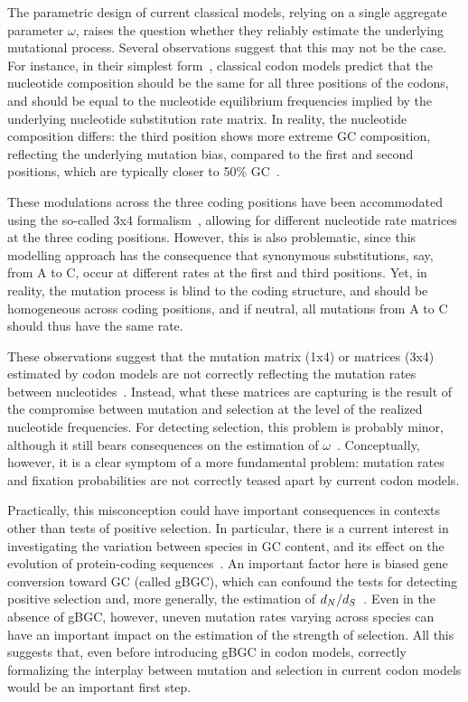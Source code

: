 The parametric design of current classical models, relying on a single aggregate parameter $\omega$, raises the question whether they reliably estimate the underlying mutational process.
Several observations suggest that this may not be the case.
For instance, in their simplest form~\citep{Muse1994, Goldman1994}, classical \gls{codon} models predict that the nucleotide composition should be the same for all three positions of the \glspl{codon}, and should be equal to the nucleotide equilibrium frequencies implied by the underlying nucleotide \gls{substitution} rate matrix.
In reality, the nucleotide composition differs: the third position shows more extreme GC composition, reflecting the underlying mutation bias, compared to the first and second positions, which are typically closer to 50\% GC~\citep{Singer2000}.

These modulations across the three coding positions have been accommodated using the so-called 3x4 formalism~\citep{Goldman1994, Pond2005a}, allowing for different nucleotide rate matrices at the three coding positions.
However, this is also problematic, since this modelling approach has the consequence that \gls{synonymous} \glspl{substitution}, say, from A to C, occur at different rates at the first and third positions.
Yet, in reality, the mutation process is blind to the coding structure, and should be homogeneous across coding positions, and if \gls{neutral}, all mutations from A to C should thus have the same rate.

These observations suggest that the mutation matrix (1x4) or matrices (3x4) estimated by \gls{codon} models are not correctly reflecting the mutation rates between nucleotides~\citep{Rodrigue2008a}.
Instead, what these matrices are capturing is the result of the compromise between mutation and selection at the level of the realized nucleotide frequencies.
For detecting selection, this problem is probably minor, although it still bears consequences on the estimation of $\omega$~\citep{Spielman2015}.
Conceptually, however, it is a clear symptom of a more fundamental problem: mutation rates and fixation probabilities are not correctly teased apart by current \gls{codon} models.

Practically, this misconception could have important consequences in contexts other than tests of positive selection.
In particular, there is a current interest in investigating the variation between species in GC content, and its effect on the evolution of protein-coding sequences~\citep{Bolivar2019}.
An important factor here is biased gene conversion toward GC (called \acrshort{gBGC}), which can confound the tests for detecting positive selection and, more generally, the estimation of $d_N / d_S$~\citep{Galtier2009,Ratnakumar2010, Figuet2014}.
Even in the absence of \acrshort{gBGC}, however, uneven mutation rates varying across species can have an important impact on the estimation of the strength of selection.
All this suggests that, even before introducing \acrshort{gBGC} in \gls{codon} models, correctly formalizing the interplay between mutation and selection in current \gls{codon} models would be an important first step.

